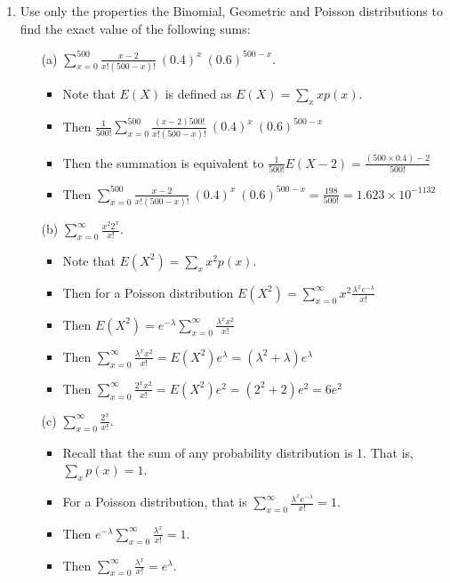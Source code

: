 \documentclass{article}
\begin{document}
\begin{enumerate}
\item Use only the properties the Binomial, Geometric and Poisson distributions to find the exact value of the following sums:
    \begin{enumerate}
    \item [(a)] $\sum_{x=0}^{500} \frac{x-2}{x!(500-x)!}~(0.4)^x~(0.6)^{500-x}$.
        \begin{itemize}
        \item Note that $E(X)$ is defined as $E(X) = \sum_{x} x p(x)$.
        \item Then $\frac{1}{500!} \sum_{x=0}^{500} \frac{(x-2)500!}{x!(500-x)!}~(0.4)^x~(0.6)^{500-x}$
        \item Then the summation is equivalent to $\frac{1}{500!} E(X - 2) = \frac{(500 \times 0.4) - 2}{500!}$
        \item Then $\sum_{x=0}^{500} \frac{x-2}{x!(500-x)!}~(0.4)^x~(0.6)^{500-x} = \frac{198}{500!} = 1.623 \times 10^{-1132}$
        \end{itemize}
    \item [(b)] $\sum_{x=0}^{\infty}\frac{x^2 2^x}{x!}$.
        \begin{itemize}
        \item Note that $E(X^2) = \sum_{x} x^2 p(x) $.
        \item Then for a Poisson distribution $E(X^2) = \sum_{x=0}^{\infty} x^2 \frac{\lambda^x e^{-\lambda}}{x!}$
        \item Then $E(X^2) = e^{-\lambda} \sum_{x=0}^{\infty} \frac{\lambda^x x^2}{x!}$
        \item Then $\sum_{x=0}^{\infty} \frac{\lambda^x x^2}{x!} = E(X^2)e^\lambda = (\lambda^2 + \lambda)e^\lambda$
        \item Then $\sum_{x=0}^{\infty} \frac{2^x x^2}{x!} = E(X^2)e^2 = (2^2 + 2)e^2 = 6 e^2$
        \end{itemize}
    \item [(c)] $\sum_{x=0}^{\infty}\frac{2^x}{x!}$.
        \begin{itemize}
        \item Recall that the sum of any probability distribution is 1. That is, $\sum_{x} p(x) = 1$.
        \item For a Poisson distribution, that is $\sum_{x=0}^{\infty} \frac{\lambda^x e^{-\lambda}}{x!} = 1$.
        \item Then $e^{-\lambda} \sum_{x=0}^{\infty} \frac{\lambda^x}{x!} = 1$.
        \item Then $\sum_{x=0}^{\infty} \frac{\lambda^x}{x!} = e^{\lambda}$.

\end{itemize}
\end{enumerate}
\end{enumerate}
\end{document}
